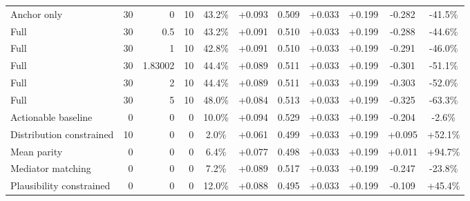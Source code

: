 \begin{table}[htbp]
\begin{tabular}{lrrrccccccc}
Anchor only & 30 & 0 & 10 & 43.2\% & +0.093 & 0.509 & +0.033 & +0.199 & -0.282 & -41.5\% \\
Full & 30 & 0.5 & 10 & 43.2\% & +0.091 & 0.510 & +0.033 & +0.199 & -0.288 & -44.6\% \\
Full & 30 & 1 & 10 & 42.8\% & +0.091 & 0.510 & +0.033 & +0.199 & -0.291 & -46.0\% \\
Full & 30 & 1.83002 & 10 & 44.4\% & +0.089 & 0.511 & +0.033 & +0.199 & -0.301 & -51.1\% \\
Full & 30 & 2 & 10 & 44.4\% & +0.089 & 0.511 & +0.033 & +0.199 & -0.303 & -52.0\% \\
Full & 30 & 5 & 10 & 48.0\% & +0.084 & 0.513 & +0.033 & +0.199 & -0.325 & -63.3\% \\
Actionable baseline & 0 & 0 & 0 & 10.0\% & +0.094 & 0.529 & +0.033 & +0.199 & -0.204 & -2.6\% \\
Distribution constrained & 10 & 0 & 0 & 2.0\% & +0.061 & 0.499 & +0.033 & +0.199 & +0.095 & +52.1\% \\
Mean parity & 0 & 0 & 0 & 6.4\% & +0.077 & 0.498 & +0.033 & +0.199 & +0.011 & +94.7\% \\
Mediator matching & 0 & 0 & 0 & 7.2\% & +0.089 & 0.517 & +0.033 & +0.199 & -0.247 & -23.8\% \\
Plausibility constrained & 0 & 0 & 0 & 12.0\% & +0.088 & 0.495 & +0.033 & +0.199 & -0.109 & +45.4\% \\
\bottomrule
\end{tabular}
\end{table}